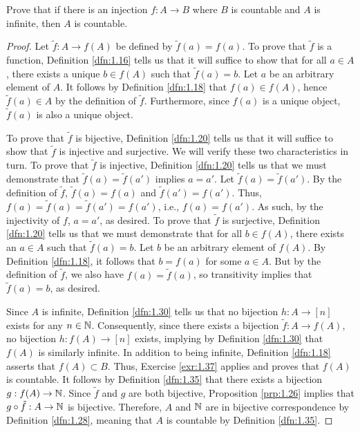 \documentclass[../main.tex]{subfiles}
\begin{document}
\begin{exercise}\label{exr:1.38}
    Prove that if there is an injection $f:A\to B$ where $B$ is countable and $A$ is infinite, then $A$ is countable.
    \begin{proof}
        Let $\tilde{f}:A\to f(A)$ be defined by $\tilde{f}(a)=f(a)$. To prove that $\tilde{f}$ is a function, Definition \ref{dfn:1.16} tells us that it will suffice to show that for all $a\in A$, there exists a unique $b\in f(A)$ such that $\tilde{f}(a)=b$. Let $a$ be an arbitrary element of $A$. It follows by Definition \ref{dfn:1.18} that $f(a)\in f(A)$, hence $\tilde{f}(a)\in A$ by the definition of $\tilde{f}$. Furthermore, since $f(a)$ is a unique object, $\tilde{f}(a)$ is also a unique object.\par
        To prove that $\tilde{f}$ is bijective, Definition \ref{dfn:1.20} tells us that it will suffice to show that $\tilde{f}$ is injective and surjective. We will verify these two characteristics in turn. To prove that $\tilde{f}$ is injective, Definition \ref{dfn:1.20} tells us that we must demonstrate that $\tilde{f}(a)=\tilde{f}(a')$ implies $a=a'$. Let $\tilde{f}(a)=\tilde{f}(a')$. By the definition of $\tilde{f}$, $\tilde{f}(a)=f(a)$ and $\tilde{f}(a')=f(a')$. Thus, $f(a)=\tilde{f}(a)=\tilde{f}(a')=f(a')$, i.e., $f(a)=f(a')$. As such, by the injectivity of $f$, $a=a'$, as desired. To prove that $\tilde{f}$ is surjective, Definition \ref{dfn:1.20} tells us that we must demonstrate that for all $b\in f(A)$, there exists an $a\in A$ such that $\tilde{f}(a)=b$. Let $b$ be an arbitrary element of $f(A)$. By Definition \ref{dfn:1.18}, it follows that $b=f(a)$ for some $a\in A$. But by the definition of $\tilde{f}$, we also have $f(a)=\tilde{f}(a)$, so transitivity implies that $\tilde{f}(a)=b$, as desired.\par
        Since $A$ is infinite, Definition \ref{dfn:1.30} tells us that no bijection $h:A\to[n]$ exists for any $n\in\mathbb{N}$. Consequently, since there exists a bijection $\tilde{f}:A\to f(A)$, no bijection $h:f(A)\to[n]$ exists, implying by Definition \ref{dfn:1.30} that $f(A)$ is similarly infinite. In addition to being infinite, Definition \ref{dfn:1.18} asserts that $f(A)\subset B$. Thus, Exercise \ref{exr:1.37} applies and proves that $f(A)$ is countable. It follows by Definition \ref{dfn:1.35} that there exists a bijection $g:f(A)\to\mathbb{N}$. Since $\tilde{f}$ and $g$ are both bijective, Proposition \ref{prp:1.26} implies that $g\circ\tilde{f}:A\to\mathbb{N}$ is bijective. Therefore, $A$ and $\mathbb{N}$ are in bijective correspondence by Definition \ref{dfn:1.28}, meaning that $A$ is countable by Definition \ref{dfn:1.35}.
    \end{proof}
\end{exercise}
\end{document}
